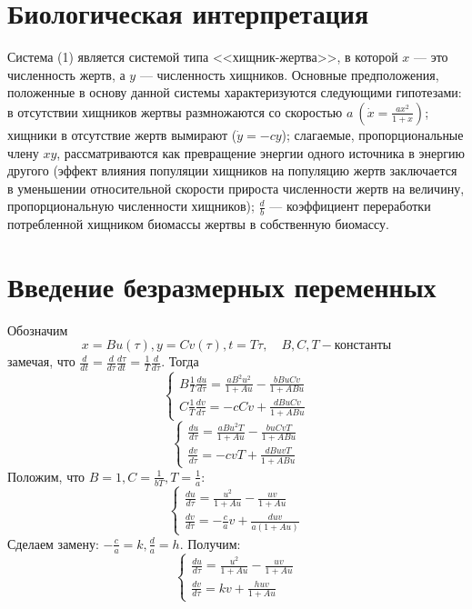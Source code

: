 \documentclass[11pt]{article}
\begin{document}
	{\section{Биологическая интерпретация}}
	{Система (1) является системой типа <<хищник-жертва>>, в которой $x$ --- это численность жертв, а $y$ --- численность хищников. Основные предположения, положенные в основу данной системы характеризуются следующими гипотезами: в отсутствии хищников жертвы размножаются со скоростью $a \ (\dot{x} = \frac{ax^2}{1 + x})$; хищники в отсутствие жертв вымирают ($\dot{y} = -cy$); слагаемые, пропорциональные члену $xy$, рассматриваются как превращение энергии одного источника в энергию другого (эффект влияния популяции хищников на популяцию жертв заключается в уменьшении относительной скорости прироста численности жертв на величину, пропорциональную численности хищников); $\frac{d}{b}$ --- коэффициент переработки потребленной хищником биомассы жертвы в собственную биомассу.}
	{\section{Введение безразмерных переменных}}
	{Обозначим}
	\begin{equation}
	x = Bu(\tau), y = Cv(\tau), t = T\tau, \quad B,C,T - \text{константы}
	\end{equation}
	{замечая, что $\frac{d}{dt} = \frac{d}{d\tau}\frac{d\tau}{dt}=\frac{1}{T}\frac{d}{d\tau}$. Тогда}
	\begin{equation}
		\begin{cases}
		B\frac{1}{T}\frac{du}{d\tau} = \frac{aB^2u^2}{1 + Au} - \frac{bBuCv}{1 + ABu}\\
		C\frac{1}{T}\frac{dv}{d\tau} = -cCv + \frac{dBuCv}{1 + ABu}
		\end{cases}
	\end{equation}
	\newpage
	\[ \begin{cases}
		\frac{du}{d\tau} = \frac{aBu^2T}{1 + Au} - \frac{buCvT}{1 + ABu}  \\
		\frac{dv}{d\tau} = -cvT + \frac{dBuvT}{1 + ABu}
	\end{cases}  \]
	{Положим, что $B = 1, C = \frac{1}{bT}, T = \frac{1}{a}$:}
	\[ \begin{cases}
		\frac{du}{d\tau} = \frac{u^2}{1 + Au} - \frac{uv}{1 + Au}\\
		\frac{dv}{d\tau} = -\frac{c}{a}v + \frac{duv}{a(1 + Au)}
	\end{cases}  \]	
	{Сделаем замену: $-\frac{c}{a} = k, \frac{d}{a} = h.$ Получим:}
	\begin{equation}
		\begin{cases}
		\frac{du}{d\tau} = \frac{u^2}{1 + Au} - \frac{uv}{1 + Au}\\
		\frac{dv}{d\tau} = kv + \frac{huv}{1 + Au}
		\end{cases}
	\end{equation}
		   
\end{document}
